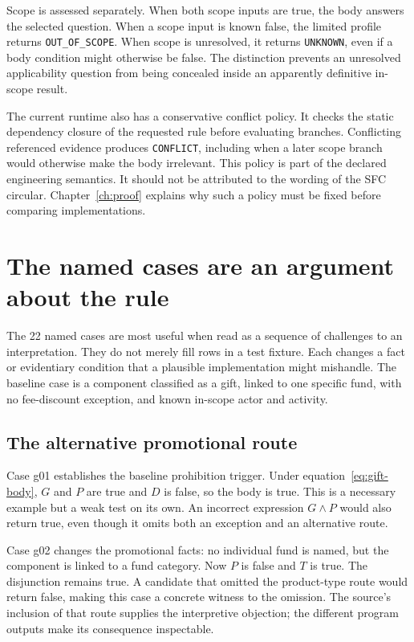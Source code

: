 \documentclass[12pt,a4paper,oneside,openany]{book}
\begin{document}
Scope is assessed separately. When both scope inputs are true, the body answers
the selected question. When a scope input is known false, the limited profile
returns \texttt{OUT\_OF\_SCOPE}. When scope is unresolved, it returns
\texttt{UNKNOWN}, even if a body condition might otherwise be false. The
distinction prevents an unresolved applicability question from being concealed
inside an apparently definitive in-scope result.

The current runtime also has a conservative conflict policy. It checks the
static dependency closure of the requested rule before evaluating branches.
Conflicting referenced evidence produces \texttt{CONFLICT}, including when a
later scope branch would otherwise make the body irrelevant. This policy is
part of the declared engineering semantics. It should not be attributed to the
wording of the SFC circular. Chapter~\ref{ch:proof} explains why such a policy
must be fixed before comparing implementations.

\section{The named cases are an argument about the rule}
\label{merge:M02:03}

\label{sec:circular-cases}
The 22 named cases are most useful when read as a sequence of challenges to an
interpretation. They do not merely fill rows in a test fixture. Each changes a
fact or evidentiary condition that a plausible implementation might mishandle.
The baseline case is a component classified as a gift, linked to one specific
fund, with no fee-discount exception, and known in-scope actor and activity.

\subsection{The alternative promotional route}
Case g01 establishes the baseline prohibition trigger. Under
equation~\eqref{eq:gift-body}, $G$ and $P$ are true and $D$ is false, so the
body is true. This is a necessary example but a weak test on its own. An
incorrect expression $G\land P$ would also return true, even though it omits
both an exception and an alternative route.

Case g02 changes the promotional facts: no individual fund is named, but the
component is linked to a fund category. Now $P$ is false and $T$ is true.
The disjunction remains true. A candidate that omitted the product-type route
would return false, making this case a concrete witness to the omission. The
source's inclusion of that route supplies the interpretive objection; the
different program outputs make its consequence inspectable.
\end{document}
